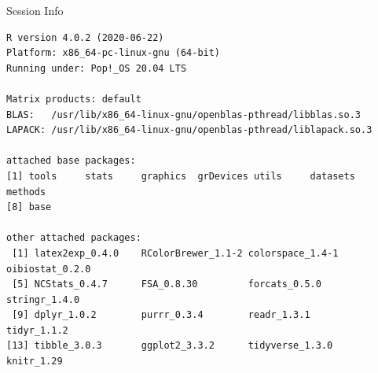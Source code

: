 \documentclass[10pt]{beamer}\usepackage[]{graphicx}\usepackage[]{color}
\makeatletter
\newenvironment{kframe}{%
 \def\at@end@of@kframe{}%
 \ifinner\ifhmode%
  \def\at@end@of@kframe{\end{minipage}}%
  \begin{minipage}{\columnwidth}%
 \fi\fi%
 \def\FrameCommand##1{\hskip\@totalleftmargin \hskip-\fboxsep
 \colorbox{shadecolor}{##1}\hskip-\fboxsep
     \hskip-\linewidth \hskip-\@totalleftmargin \hskip\columnwidth}%
 \MakeFramed {\advance\hsize-\width
   \@totalleftmargin\z@ \linewidth\hsize
   \@setminipage}}%
 {\par\unskip\endMakeFramed%
 \at@end@of@kframe}
\newenvironment{knitrout}{}{} %
\makeatother
\begin{document}
\begin{frame}[fragile]{Session Info}
	\tiny
	
\begin{knitrout}\tiny
{}\color{fgcolor}\begin{kframe}
\begin{verbatim}
R version 4.0.2 (2020-06-22)
Platform: x86_64-pc-linux-gnu (64-bit)
Running under: Pop!_OS 20.04 LTS

Matrix products: default
BLAS:   /usr/lib/x86_64-linux-gnu/openblas-pthread/libblas.so.3
LAPACK: /usr/lib/x86_64-linux-gnu/openblas-pthread/liblapack.so.3

attached base packages:
[1] tools     stats     graphics  grDevices utils     datasets  methods  
[8] base     

other attached packages:
 [1] latex2exp_0.4.0    RColorBrewer_1.1-2 colorspace_1.4-1   oibiostat_0.2.0   
 [5] NCStats_0.4.7      FSA_0.8.30         forcats_0.5.0      stringr_1.4.0     
 [9] dplyr_1.0.2        purrr_0.3.4        readr_1.3.1        tidyr_1.1.2       
[13] tibble_3.0.3       ggplot2_3.3.2      tidyverse_1.3.0    knitr_1.29        


\end{verbatim}
\end{kframe}
\end{knitrout}
\end{frame}
\end{document}

